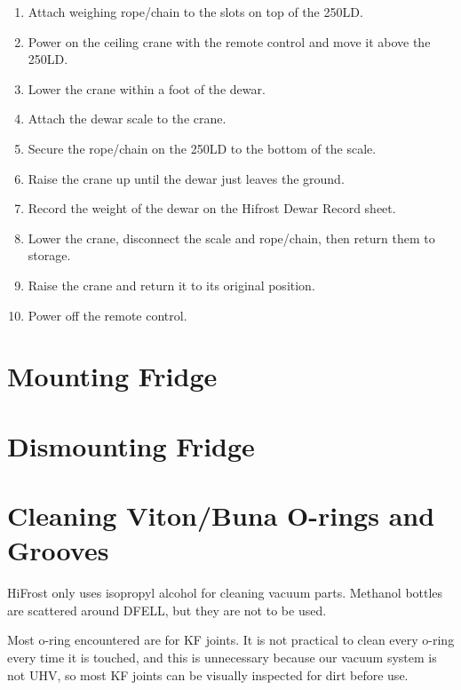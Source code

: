 \begin{enumerate}
 \item Attach weighing rope/chain to the slots on top of the 250LD.
 \item Power on the ceiling crane with the remote control and move it above the 250LD.
 \item Lower the crane within a foot of the dewar.
 \item Attach the dewar scale to the crane.
 \item Secure the rope/chain on the 250LD to the bottom of the scale.
 \item Raise the crane up until the dewar just leaves the ground.
 \item Record the weight of the dewar on the Hifrost Dewar Record sheet.
 \item Lower the crane, disconnect the scale and rope/chain, then return them to storage.
 \item Raise the crane and return it to its original position.
 \item Power off the remote control.
\end{enumerate}

\section{Mounting Fridge}

\section{Dismounting Fridge}

\section{Cleaning Viton/Buna O-rings and Grooves}
\label{cleaning-orings}

HiFrost only uses isopropyl alcohol for cleaning vacuum parts.  Methanol bottles are scattered around DFELL, but they are not to be used.

Most o-ring encountered are for KF joints.  It is not practical to clean every o-ring every time it is touched, and this is unnecessary because our vacuum system is not UHV, so most KF joints can be visually inspected for dirt before use.



